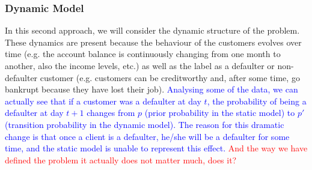 \subsubsection*{Dynamic Model} 

In this second approach, we will consider the dynamic structure of the problem. These dynamics are present because the behaviour of the customers evolves over time (e.g. the account balance is continuously changing from one month to another, also the income levels, etc.)  as well as the label as a defaulter or non-defaulter customer (e.g. customers can be creditworthy and, after some time, go bankrupt because they have lost their job). \textcolor{blue}{Analysing some of the data, we can actually see that if a customer was a defaulter at day $t$, the probability of being a defaulter at day $t+1$ changes from $p$ (prior probability in the static model) to $p'$ (transition probability in the dynamic model). The reason for this dramatic change is that once a client is a defaulter, he/she will be a defaulter for some time, and the static model is unable to represent this effect.} \textcolor{red}{ And the way we have defined the problem it actually does not matter much, does it?} 




%  
%  
%  
%  
%  

